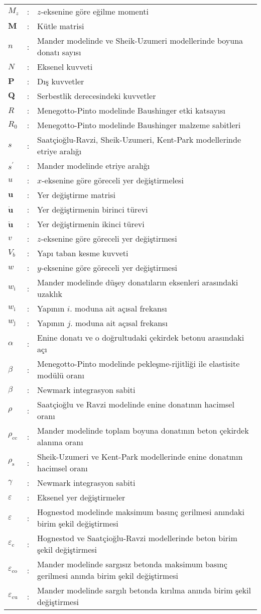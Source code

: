 \begin{longtable}[c]{>{\raggedright}p{1cm}l>{\raggedright}p{13.4cm}}
$M_{z}$  & :  & $z$-eksenine göre eğilme momenti\tabularnewline
$\mathbf{M}$  & :  & Kütle matrisi\tabularnewline
$n$  & :  & Mander modelinde ve Sheik-Uzumeri modellerinde boyuna donatı sayısı\tabularnewline
$N$  & :  & Eksenel kuvveti\tabularnewline
$\mathbf{P}$  & :  & Dış kuvvetler\tabularnewline
$\mathbf{Q}$  & :  & Serbestlik derecesindeki kuvvetler\tabularnewline
$R$  & :  & Menegotto-Pinto modelinde Baushinger etki katsayısı\tabularnewline
$R_{0}$  & :  & Menegotto-Pinto modelinde Baushinger malzeme sabitleri\tabularnewline
$s$  & :  & Saatçioğlu-Ravzi, Sheik-Uzumeri, Kent-Park modellerinde etriye aralığı\tabularnewline
$s^{'}$  & :  & Mander modelinde etriye aralığı\tabularnewline
$u$  & :  & $x$-eksenine göre göreceli yer değiştirmelesi\tabularnewline
$\mathbf{u}$  & :  & Yer değiştirme matrisi\tabularnewline
$\dot{\mathbf{u}}$  & :  & Yer değiştirmenin birinci türevi\tabularnewline
$\ddot{\mathbf{u}}$  & :  & Yer değiştirmenin ikinci türevi\tabularnewline
$v$  & :  & $z$-eksenine göre göreceli yer değiştirmesi\tabularnewline
$V_{b}$  & :  & Yapı taban kesme kuvveti \tabularnewline
$w$  & :  & $y$-eksenine göre göreceli yer değiştirmesi\tabularnewline
$w_{\text{i}}$  & :  & Mander modelinde düşey donatıların eksenleri arasındaki uzaklık\tabularnewline
$w_{\text{i}}$  & :  & Yapının $i$. moduna ait açısal frekansı\tabularnewline
$w_{\text{j}}$  & :  & Yapının $j$. moduna ait açısal frekansı\tabularnewline
$\alpha$  & :  & Enine donatı ve o doğrultudaki çekirdek betonu arasındaki açı \tabularnewline
$\beta$  & :  & Menegotto-Pinto modelinde pekleşme-rijitliği ile elastisite modülü
oranı\tabularnewline
$\beta$  & :  & Newmark integrasyon sabiti \tabularnewline
$\rho$  & :  & Saatçioğlu ve Ravzi modelinde enine donatının hacimsel oranı\tabularnewline
$\rho_{\text{cc}}$  & :  & Mander modelinde toplam boyuna donatının beton çekirdek alanına oranı\tabularnewline
$\rho_{\text{s}}$  & :  & Sheik-Uzumeri ve Kent-Park modellerinde enine donatının hacimsel oranı\tabularnewline
$\gamma$  & :  & Newmark integrasyon sabiti \tabularnewline
\noindent \textit{$\varepsilon$}  & :  & Eksenel yer değiştirmeler\tabularnewline
$\varepsilon$  & :  & Hognestod modelinde maksimum basınç gerilmesi anındaki birim şekil
değiştirmesi\tabularnewline
$\varepsilon_{\mathrm{c}}$  & :  & Hognestod ve Saatçioğlu-Ravzi modellerinde beton birim şekil değiştirmesi\tabularnewline
$\varepsilon_{\text{co}}$  & :  & Mander modelinde sargısız betonda maksimum basınç gerilmesi anında
birim şekil değiştirmesi\tabularnewline
$\varepsilon_{\text{cu}}$  & :  & Mander modelinde sargılı betonda kırılma anında birim şekil değiştirmesi\tabularnewline

\end{longtable}
